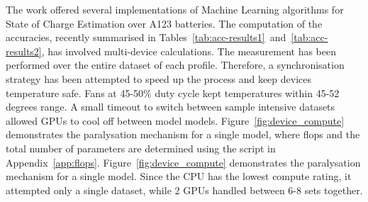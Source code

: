 The work offered several implementations of Machine Learning algorithms for State of Charge Estimation over A123 batteries.
The computation of the accuracies, recently summarised in \mbox{Tables~\ref{tab:acc-results1} and~\ref{tab:acc-results2}}, has involved multi-device calculations.
The measurement has been performed over the entire dataset of each profile.
Therefore, a synchronisation strategy has been attempted to speed up the process and keep devices temperature safe.
Fans at 45-50\% duty cycle kept temperatures within 45-52 degrees range.
A small timeout to switch between sample intensive datasets allowed GPUs to cool off between model models.
%
%
{
\mbox{Figure~\ref{fig:device_compute}} demonstrates the paralysation mechanism for a single model, where flops and the total number of parameters are determined using the script in Appendix~\ref{app:flops}.
}
{
\mbox{Figure~\ref{fig:device_compute}} demonstrates the paralysation mechanism for a single model.
}
Since the CPU has the lowest compute rating, it attempted only a single dataset, while 2 GPUs handled between 6-8 sets together. 


